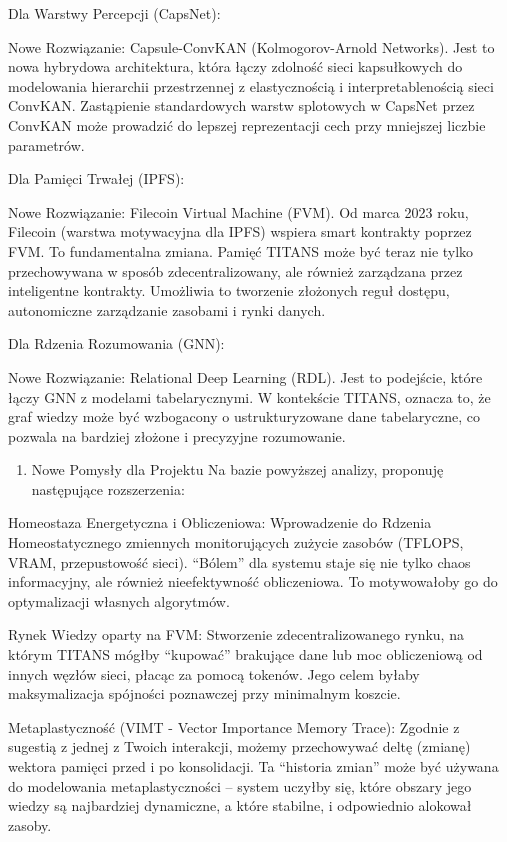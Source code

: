 \documentclass[letterpaper,twocolumn]{article}
\providecommand{\tightlist}{%
  \setlength{\itemsep}{0pt}\setlength{\parskip}{0pt}}
\begin{document}
Dla Warstwy Percepcji (CapsNet):

Nowe Rozwiązanie: Capsule-ConvKAN (Kolmogorov-Arnold Networks). Jest to
nowa hybrydowa architektura, która łączy zdolność sieci kapsułkowych do
modelowania hierarchii przestrzennej z elastycznością i
interpretablenością sieci ConvKAN. Zastąpienie standardowych warstw
splotowych w CapsNet przez ConvKAN może prowadzić do lepszej
reprezentacji cech przy mniejszej liczbie parametrów.

Dla Pamięci Trwałej (IPFS):

Nowe Rozwiązanie: Filecoin Virtual Machine (FVM). Od marca 2023 roku,
Filecoin (warstwa motywacyjna dla IPFS) wspiera smart kontrakty poprzez
FVM. To fundamentalna zmiana. Pamięć TITANS może być teraz nie tylko
przechowywana w sposób zdecentralizowany, ale również zarządzana przez
inteligentne kontrakty. Umożliwia to tworzenie złożonych reguł dostępu,
autonomiczne zarządzanie zasobami i rynki danych.

Dla Rdzenia Rozumowania (GNN):

Nowe Rozwiązanie: Relational Deep Learning (RDL). Jest to podejście,
które łączy GNN z modelami tabelarycznymi. W kontekście TITANS, oznacza
to, że graf wiedzy może być wzbogacony o ustrukturyzowane dane
tabelaryczne, co pozwala na bardziej złożone i precyzyjne rozumowanie.

\begin{enumerate}
\def\labelenumi{\arabic{enumi}.}
\setcounter{enumi}{1}
\tightlist
\item
  Nowe Pomysły dla Projektu Na bazie powyższej analizy, proponuję
  następujące rozszerzenia:
\end{enumerate}

Homeostaza Energetyczna i Obliczeniowa: Wprowadzenie do Rdzenia
Homeostatycznego zmiennych monitorujących zużycie zasobów (TFLOPS, VRAM,
przepustowość sieci). ``Bólem'' dla systemu staje się nie tylko chaos
informacyjny, ale również nieefektywność obliczeniowa. To motywowałoby
go do optymalizacji własnych algorytmów.

Rynek Wiedzy oparty na FVM: Stworzenie zdecentralizowanego rynku, na
którym TITANS mógłby ``kupować'' brakujące dane lub moc obliczeniową od
innych węzłów sieci, płacąc za pomocą tokenów. Jego celem byłaby
maksymalizacja spójności poznawczej przy minimalnym koszcie.

Metaplastyczność (VIMT - Vector Importance Memory Trace): Zgodnie z
sugestią z jednej z Twoich interakcji, możemy przechowywać deltę
(zmianę) wektora pamięci przed i po konsolidacji. Ta ``historia zmian''
może być używana do modelowania metaplastyczności -- system uczyłby się,
które obszary jego wiedzy są najbardziej dynamiczne, a które stabilne, i
odpowiednio alokował zasoby.
\end{document}
